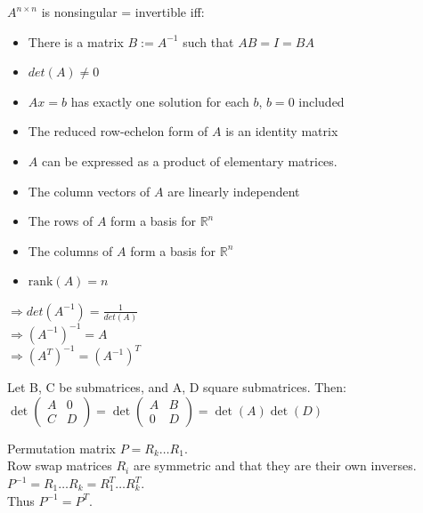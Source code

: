 \begin{multicols}{3}
$A^{n \times n}$ is nonsingular = invertible iff:\\
\begin{itemize}
\item There is a matrix $B := A^{-1}$ such that $AB = I = BA$\\
\item $det(A) \ne 0$\\
\item $Ax = b$ has exactly one solution for each $b$, $b = 0$ included\\
\item The reduced row-echelon form of $A$ is an identity matrix\\
\item $A$ can be expressed as a product of elementary matrices.\\
\item The column vectors of $A$ are linearly independent\\
\item The rows of $A$ form a basis for $\mathbb{R}^{n}$\\
\item The columns of $A$ form a basis for $\mathbb{R}^{n}$\\
\item $\text{rank}(A) = n$\\
\end{itemize}

\smallbreak
$\Rightarrow det(A^{-1}) = \frac{1}{det(A)}$\\
$\Rightarrow (A^{-1})^{-1} = A$\\
$\Rightarrow (A^{T})^{-1} = (A^{-1})^{T}$

Let B, C be submatrices, and A, D square submatrices. Then:\\
$\det\begin{pmatrix}A& 0\\ C& D\end{pmatrix} = \det\begin{pmatrix}A& B\\ 0& D\end{pmatrix} = \det(A) \det(D)$

Permutation matrix $P = R_{k} \dots R_{1}$.\\
Row swap matrices $R_{i}$ are symmetric and that they are their own inverses.\\
$P^{-1} = R_{1} \dots R_{k} = R_{1}^{T} \dots R_{k}^{T}$.\\
Thus $P^{-1} = P^{T}$.


\end{multicols}
